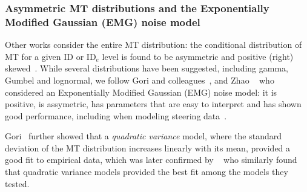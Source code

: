 \documentclass[acmlarge, manuscript,review]{acmart}
\newcommand{\mt}{\ensuremath{{\text{MT}}}\xspace}
\newcommand{\ide}{\ensuremath{{\text{ID}_e}}\xspace}
\begin{document}
\subsubsection{Asymmetric MT distributions and the Exponentially Modified Gaussian (EMG) noise model \label{subs:rw::emg}}
Other works consider the entire MT distribution: the conditional distribution of MT for a given ID or \ide level is found to be asymmetric and positive (right) skewed~\cite{gori2018these,gori2019,zhao2022, jude2016,nieuwenhuizen2016, li2024,chapuis2007}.
While several distributions have been suggested, including gamma, Gumbel and lognormal, we follow Gori and colleagues~\cite{gori2018these,gori2019, li2024}, and Zhao \etal~\cite{zhao2022} who considered an Exponentially Modified Gaussian (EMG) noise model: it is positive, is assymetric, %
has parameters that are easy to interpret and has shown good performance, including when modeling steering data~\cite{wang2021}.%


Gori~\cite{gori2018these} further showed that a \textit{quadratic variance} model, where the standard deviation of the MT distribution increases linearly with its mean, provided a good fit to empirical data,
which was later confirmed by \citeauthor{zhao2022}~\cite{zhao2022} who similarly found that quadratic variance models provided the best fit among the models they tested.
\end{document}
